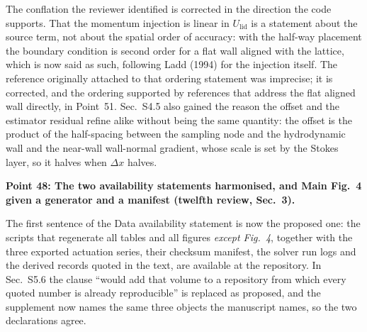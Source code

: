 \documentclass[11pt,a4paper]{article}
\begin{document}
The conflation the reviewer identified is corrected in the direction the code supports.
That the momentum injection is linear in \(U_{\mathrm{lid}}\) is a statement about the
source term, not about the spatial order of accuracy: with the half-way placement the
boundary condition is second order for a flat wall aligned with the lattice, which is
now said as such, following Ladd (1994) for the injection itself. The reference
originally attached to that ordering statement was imprecise; it is corrected, and the
ordering supported by references that address the flat aligned wall directly, in
Point~51. Sec.~S4.5 also gained the reason the offset and
the estimator residual refine alike without being the same quantity: the offset is the
product of the half-spacing between the sampling node and the hydrodynamic wall and the
near-wall wall-normal gradient, whose scale is set by the Stokes layer, so it halves when
\(\Delta x\) halves.

\vspace{1em}

\noindent\textbf{Point 48: The two availability statements harmonised, and Main Fig.~4
given a generator and a manifest (twelfth review, Sec.~3).}

The first sentence of the Data availability statement is now the proposed one: the
scripts that regenerate all tables and all figures \emph{except Fig.~4}, together with
the three exported actuation series, their checksum manifest, the solver run logs and the
derived records quoted in the text, are available at the repository. In Sec.~S5.6 the
clause ``would add that volume to a repository from which every quoted number is already
reproducible'' is replaced as proposed, and the supplement now names the same three
objects the manuscript names, so the two declarations agree.
\end{document}
